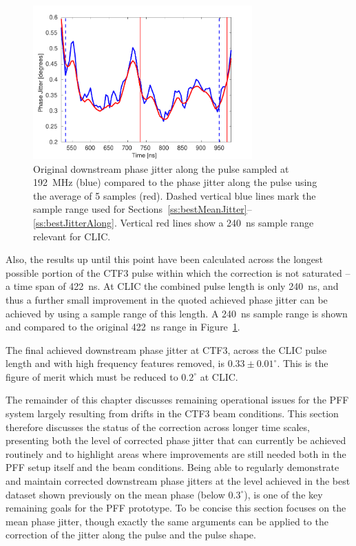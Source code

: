 \begin{figure}
  \centering
  \includegraphics[width=0.75\textwidth]{Figures/feedforward/BestFF_CLICPulse}
  \caption{Original downstream phase jitter along the pulse sampled at 192~MHz (blue) compared to
  the phase jitter along the pulse using the average of 5 samples (red). Dashed vertical
  blue lines mark the sample range used for Sections~\ref{ss:bestMeanJitter}--\ref{ss:bestJitterAlong}. Vertical red lines
  show a 240~ns sample range relevant for CLIC.}
  \label{f:BestFF_CLICPulse}
\end{figure}

Also, the results up until this point have been calculated across the longest possible
portion of the CTF3 pulse within which the correction is not saturated -- a time span of 422~ns. At CLIC the combined pulse length is only 240~ns, and thus a further small improvement in the quoted achieved phase jitter can be achieved by using a sample range of this length. A 240~ns sample range is shown and compared to the original 422~ns range in Figure~\ref{f:BestFF_CLICPulse}.

The final achieved downstream phase jitter at CTF3, across the CLIC pulse length and with high frequency features removed, is \(0.33\pm0.01^\circ\). This is the figure of merit which must be reduced to \(0.2^\circ\) at CLIC. 


The remainder of this chapter discusses remaining operational issues for the PFF system largely resulting from drifts in the CTF3 beam conditions. This section therefore discusses the status of the correction across longer time scales, presenting both the level of corrected phase jitter that can currently be achieved routinely and to highlight areas where improvements are still needed both in the PFF setup itself and the beam conditions. Being able to regularly demonstrate and maintain corrected downstream phase jitters at the level achieved in the best dataset shown previously on the mean phase (below \(0.3^\circ\)), is one of the key remaining goals for the PFF prototype. To be concise this section focuses on the mean phase jitter, though exactly the same arguments can be applied to the correction of the jitter along the pulse and the pulse shape.

